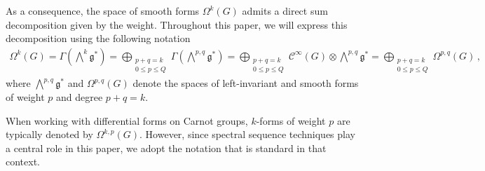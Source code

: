 \documentclass[dvipsnames]{amsart}
\theoremstyle{definition}
\theoremstyle{definition}
\numberwithin{equation}{section}
\begin{document}
As a consequence, the space of smooth forms $\Omega^k(G)$ admits a direct sum decomposition given by the weight. Throughout this paper, we will express this decomposition using the following notation
\begin{align}\label{eq: direct sum decomp of forms according to weight}
    \Omega^k(G)=\Gamma\left(\bigwedge\nolimits^k\mathfrak{g}^\ast\right)=\bigoplus_{\substack{p+q=k\\0\le p\le Q}}\Gamma\left(\bigwedge\nolimits^{p,q}\mathfrak{g}^\ast\right)=\bigoplus_{\substack{p+q=k\\ 0\le p\le Q}}\mathcal{C}^\infty(G)\otimes\bigwedge\nolimits^{p,q}\mathfrak{g}^\ast=\bigoplus_{\substack{ p+q=k\\ 0\le p\le Q}}\Omega^{p,q}(G)\,,
\end{align}
where $\bigwedge^{p,q}\mathfrak{g}^\ast$ and $\Omega^{p,q}(G)$ denote the spaces of left-invariant and smooth forms of weight $p$ and degree $p+q=k$.

When working with differential forms on Carnot groups, $k$-forms of weight $p$ are typically denoted by $\Omega^{k,p}(G)$. However, since spectral sequence techniques play a central role in this paper, we adopt the notation that is standard in that context.
\end{document}
